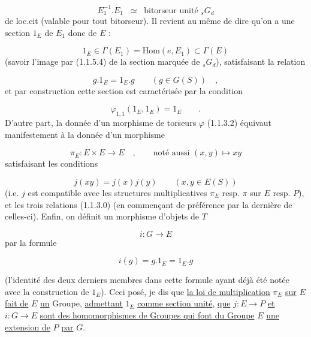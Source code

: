 \begin{equation*}
E_1^{-1}.E_1 \;\; \simeq \;\; \text{bitorseur unité } {}_sG_d
\end{equation*}
de loc.cit (valable pour tout bitorseur). Il revient au même de dire qu'on a une section $1_E$ de $E_1$ donc de $E$ :

\begin{equation}\tag{1.1.5.5}
1_E \in \Gamma(E_1) = \mathrm{Hom}(e,E_1) \subset \Gamma(E)
\end{equation}
(savoir l'image par (1.1.5.4) de la section marquée de ${}_sG_d$), satisfaisant la relation

\begin{equation*}
g.1_E = 1_E.g \qquad (g \in G(S)) \quad ,
\end{equation*}
et par construction cette section est caractérisée par la condition

\begin{equation}\tag{1.1.5.6}
\varphi_{1,1}(1_E,1_E) = 1_E \qquad .
\end{equation}
D'autre part, la donnée d'un morphisme de torseurs $\varphi$ (1.1.3.2) équivaut manifestement à la donnée d'un morphisme

\begin{equation}\tag{1.1.5.7}
\pi_E : E\times E \longrightarrow E \quad , \qquad \text{noté aussi } (x,y) \longmapsto xy
\end{equation}
satisfaisant les conditions

\begin{equation}\tag{1.1.5.8}
j(xy) = j(x)j(y) \qquad (x,y \in E(S))
\end{equation}
(i.e. $j$ est compatible avec les structures multiplicatives $\pi_E$ resp. $\pi$ sur $E$ resp. $P$), et les trois relations (1.1.3.0) (en commençant de préférence par la dernière de celles-ci). Enfin, on définit un morphisme d'objets de \underline{$T$}

\begin{equation*}
i : G \longrightarrow E
\end{equation*}
par la formule

\begin{equation}\tag{1.1.5.9}
i(g) = g.1_E = 1_E.g 
\end{equation}


 (l'identité des deux derniers membres dans cette formule ayant déjà été notée avec la construction de $1_E$). Ceci posé, je dis que \underline{la loi de multiplication} $\pi_E$ \underline{sur} $E$ \underline{fait de} $E$ \underline{un} Groupe, \underline{admettant} $1_E$ \underline{comme section unité}, \underline{que} $j : E \rightarrow P$ \underline{et} $i : G \rightarrow E$ \underline{sont des homomorphismes de Groupes qui font du Groupe} $E$ \underline{une extension de} $P$ \underline{par} $G$.

